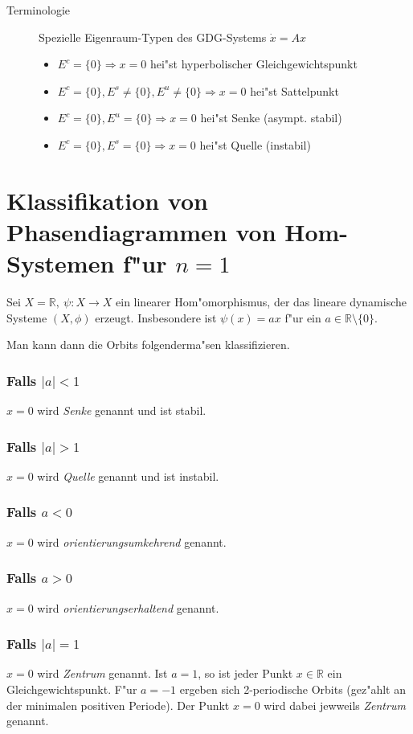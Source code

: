 \documentclass[a4paper, 13pt]{scrreprt}
\theoremstyle{definition} \newtheorem{definition}{Definition}[section]
\newcommand{\RR}{\mathbb{R}}
\begin{document}
\begin{description}
	\item[Terminologie]Spezielle Eigenraum-Typen des GDG-Systems $\dot x = Ax$ \\
	\begin{itemize}
		\item \(E^c = \{0\} \Rightarrow x =0\) hei"st hyperbolischer Gleichgewichtspunkt 
		\item \(E^c = \{0\}, {E^s \not= \{0\}, E^u \not= \{0\}} \Rightarrow x =0\) hei"st Sattelpunkt
		\item \(E^c = \{0\}, E^u = \{0\} \Rightarrow x =0\) hei"st Senke (asympt. stabil) 
		\item \(E^c = \{0\}, E^s = \{0\} \Rightarrow x =0\) hei"st Quelle (instabil)
		
	\end{itemize}
\end{description} 

\section{Klassifikation von Phasendiagrammen von Hom-Systemen f"ur $n=1$}

Sei $X = \RR, \ \psi\colon X \to X$ ein linearer Hom"omorphismus, der das lineare dynamische Systeme $(X,\phi)$ erzeugt. Insbesondere ist $\psi(x) = ax$ f"ur ein $a\in\RR\setminus\{0\}$.

Man kann dann die Orbits folgenderma"sen klassifizieren.
\subsubsection{Falls $|a| < 1$}
$x=0$ wird \emph{Senke} genannt und ist stabil.
\subsubsection{Falls $|a| > 1$}
$x=0$ wird \emph{Quelle} genannt und ist instabil.
\subsubsection{Falls $ a < 0$}
$x=0$ wird \emph{orientierungsumkehrend} genannt.
\subsubsection{Falls $a > 0$}
$x=0$ wird \emph{orientierungserhaltend} genannt.
\subsubsection{Falls $|a| = 1$}
$x=0$ wird \emph{Zentrum} genannt. Ist $a = 1$, so ist jeder Punkt $x\in\RR$ ein Gleichgewichtspunkt. F"ur $a=-1$ ergeben sich 2-periodische Orbits (gez"ahlt an der minimalen positiven Periode). Der Punkt \(x = 0\) wird dabei jewweils \emph{Zentrum} genannt.
\end{document}
